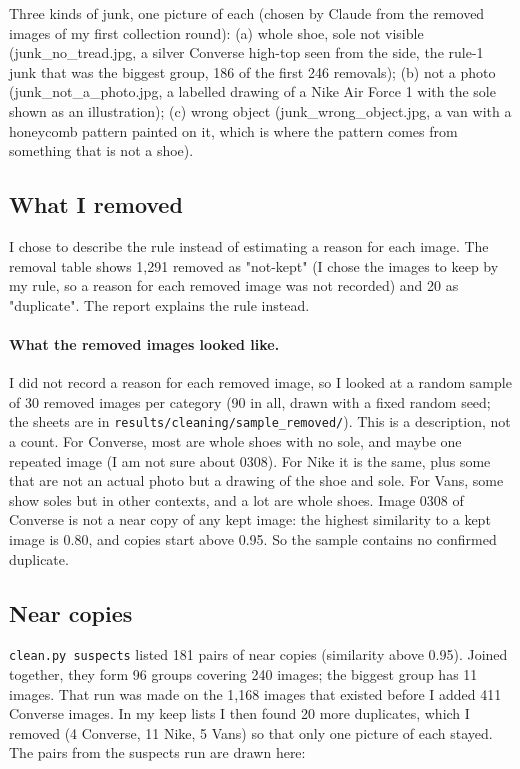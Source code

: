 \documentclass[11pt]{article}
\begin{document}
Three kinds of junk, one picture of each (chosen by Claude from the removed images of my first collection round): (a) whole shoe, sole not visible (junk\_no\_tread.jpg, a silver Converse high-top seen from the side, the rule-1 junk that was the biggest group, 186 of the first 246 removals); (b) not a photo (junk\_not\_a\_photo.jpg, a labelled drawing of a Nike Air Force 1 with the sole shown as an illustration); (c) wrong object (junk\_wrong\_object.jpg, a van with a honeycomb pattern painted on it, which is where the pattern comes from something that is not a shoe).

\subsection*{What I removed}

I chose to describe the rule instead of estimating a reason for each image. The removal table shows 1,291 removed as "not-kept" (I chose the images to keep by my rule, so a reason for each removed image was not recorded) and 20 as "duplicate". The report explains the rule instead.

\paragraph{What the removed images looked like.} I did not record a reason for each removed image, so I looked at a random sample of 30 removed images per category (90 in all, drawn with a fixed random seed; the sheets are in \texttt{results/cleaning/sample\_removed/}). This is a description, not a count. For Converse, most are whole shoes with no sole, and maybe one repeated image (I am not sure about 0308). For Nike it is the same, plus some that are not an actual photo but a drawing of the shoe and sole. For Vans, some show soles but in other contexts, and a lot are whole shoes. Image 0308 of Converse is not a near copy of any kept image: the highest similarity to a kept image is 0.80, and copies start above 0.95. So the sample contains no confirmed duplicate.

\subsection*{Near copies}
\texttt{clean.py suspects} listed 181 pairs of near copies (similarity above 0.95). Joined together, they form 96 groups covering 240 images; the biggest group has 11 images. That run was made on the 1,168 images that existed before I added 411 Converse images. In my keep lists I then found 20 more duplicates, which I removed (4 Converse, 11 Nike, 5 Vans) so that only one picture of each stayed. The pairs from the suspects run are drawn here:
\end{document}
